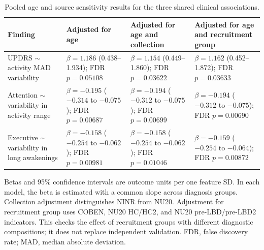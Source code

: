 \documentclass[referee,pdflatex,sn-vancouver-num]{sn-jnl}
\begin{document}
\begin{table}[t]
\caption{Pooled age and source sensitivity results for the three shared clinical associations.}
\label{tab:shared-association-sensitivity}
\centering
\scriptsize
\setlength{\tabcolsep}{4pt}
\begin{tabular}{@{}>{\raggedright\arraybackslash}p{}>{\raggedright\arraybackslash}p{}>{\raggedright\arraybackslash}p{}>{\raggedright\arraybackslash}p{}@{}}
\toprule
Finding & Adjusted for age & Adjusted for age and collection & Adjusted for age and recruitment group \\
\midrule
UPDRS $\sim$ activity MAD variability & $\beta=1.186$ (0.438--1.934); FDR $p=0.05108$ & $\beta=1.154$ (0.449--1.860); FDR $p=0.03622$ & $\beta=1.162$ (0.452--1.872); FDR $p=0.03633$ \\
\midrule
Attention $\sim$ variability in activity range & $\beta=-0.195$ ($-0.314$ to $-0.075$); FDR $p=0.00687$ & $\beta=-0.194$ ($-0.312$ to $-0.075$); FDR $p=0.00699$ & $\beta=-0.194$ ($-0.312$ to $-0.075$); FDR $p=0.00690$ \\
\midrule
Executive $\sim$ variability in long awakenings & $\beta=-0.158$ ($-0.254$ to $-0.062$); FDR $p=0.00981$ & $\beta=-0.158$ ($-0.254$ to $-0.062$); FDR $p=0.01046$ & $\beta=-0.159$ ($-0.254$ to $-0.064$); FDR $p=0.00872$ \\
\bottomrule
\end{tabular}

\medskip
\begin{minipage}{0.96\textwidth}\footnotesize
Betas and 95\% confidence intervals are outcome units per one feature SD. In
each model, the beta is estimated with a common slope across diagnosis groups.
Collection adjustment distinguishes NINR from NU20. Adjustment for recruitment group
uses COBEN, NU20 HC/HC2, and
NU20 pre-LBD/pre-LBD2 indicators. This checks the effect of recruitment groups
with different diagnostic compositions; it does not replace independent
validation. FDR, false discovery rate; MAD, median absolute deviation.
\end{minipage}
\end{table}
\end{document}

